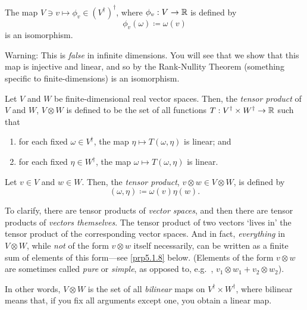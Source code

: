 \begin{prp}\label{prp5.1.4}
The map $V\ni v\mapsto \phi _v\in (V^\dagger )^\dagger$, where $\phi _v:V\rightarrow \mathbb{R}$ is defined by
\begin{equation}
\phi _v(\omega )\coloneqq \omega (v)
\end{equation}
is an isomorphism.
\begin{rmk}
Warning:  This is \emph{false} in infinite dimensions.  You will see that we show that this map is injective and linear, and so by the Rank-Nullity Theorem (something specific to finite-dimensions) is an isomorphism.
\end{rmk}
\end{prp}
\begin{dfn}\label{TensorProduct}
Let $V$ and $W$ be finite-dimensional real vector spaces.  Then, the \emph{tensor product} of $V$ and $W$, $V\otimes W$ is defined to be the set of all functions $T:V^{\dagger}\times W^{\dagger}\rightarrow \mathbb{R}$ such that
\begin{enumerate}
\item for each fixed $\omega \in V^{\dagger}$, the map $\eta \mapsto T(\omega ,\eta )$ is linear; and
\item for each fixed $\eta \in W^{\dagger}$, the map $\omega \mapsto T(\omega ,\eta )$ is linear.
\end{enumerate}
Let $v\in V$ and $w\in W$.  Then, the \emph{tensor product}, $v\otimes w\in V\otimes W$, is defined by
\begin{equation}
[v\otimes w](\omega ,\eta )\coloneqq \omega (v)\eta (w).
\end{equation}
\begin{rmk}
To clarify, there are tensor products of \emph{vector spaces}, and then there are tensor products of \emph{vectors themselves}.  The tensor product of two vectors `lives in' the tensor product of the corresponding vector spaces.  And in fact, \emph{everything} in $V\otimes W$, while \emph{not} of the form $v\otimes w$ itself necessarily, can be written as a finite sum of elements of this form---see \cref{prp5.1.8} below.  (Elements of the form $v\otimes w$ are sometimes called \emph{pure} or \emph{simple}, as opposed to, e.g.~, $v_1\otimes w_1+v_2\otimes w_2$).
\end{rmk}
\begin{rmk}
In other words, $V\otimes W$ is the set of all \emph{bilinear} maps on $V^{\dagger}\times W^{\dagger}$, where bilinear means that, if you fix all arguments except one, you obtain a linear map.

\end{rmk}
\end{dfn}

